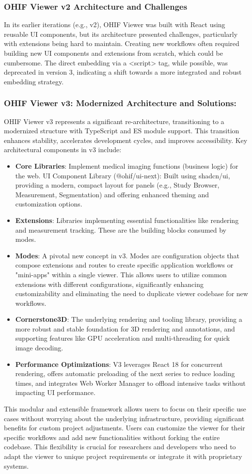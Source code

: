 \subsubsection*{OHIF Viewer v2 Architecture and Challenges}
In its earlier iterations (e.g., v2), OHIF Viewer was built with React using reusable UI components, but its architecture presented challenges, particularly with extensions being hard to maintain. Creating new workflows often required building new UI components and extensions from scratch, which could be cumbersome. The direct embedding via a <script> tag, while possible, was deprecated in version 3, indicating a shift towards a more integrated and robust embedding strategy.
\subsubsection*{OHIF Viewer v3: Modernized Architecture and Solutions:}
OHIF Viewer v3 represents a significant re-architecture, transitioning to a modernized structure with TypeScript and ES module support. This transition enhances stability, accelerates development cycles, and improves accessibility. Key architectural components in v3 include:
\begin{itemize}
    \item \textbf{Core Libraries}: Implement medical imaging functions (business logic) for the web. UI Component Library (@ohif/ui-next): Built using shadcn/ui, providing a modern, compact layout for panels (e.g., Study Browser, Measurement, Segmentation) and offering enhanced theming and customization options.
    \item \textbf{Extensions}: Libraries implementing essential functionalities like rendering and measurement tracking. These are the building blocks consumed by modes.
    \item \textbf{Modes}: A pivotal new concept in v3. Modes are configuration objects that compose extensions and routes to create specific application workflows or "mini-apps" within a single viewer. This allows users to utilize common extensions with different configurations, significantly enhancing customizability and eliminating the need to duplicate viewer codebase for new workflows.
    \item \textbf{Cornerstone3D}: The underlying rendering and tooling library, providing a more robust and stable foundation for 3D rendering and annotations, and supporting features like GPU acceleration and multi-threading for quick image decoding.
    \item \textbf{Performance Optimizations}: V3 leverages React 18 for concurrent rendering, offers automatic preloading of the next series to reduce loading times, and integrates Web Worker Manager to offload intensive tasks without impacting UI performance.
\end{itemize}
This modular and extensible framework allows users to focus on their specific use cases without worrying about the underlying infrastructure, providing significant benefits for custom project adjustments. Users can customize the viewer for their specific workflows and add new functionalities without forking the entire codebase. This flexibility is crucial for researchers and developers who need to adapt the viewer to unique project requirements or integrate it with proprietary systems.
